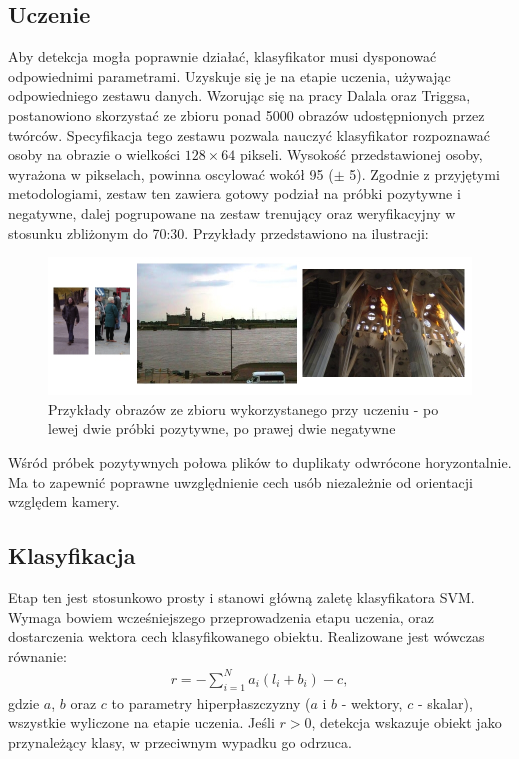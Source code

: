 \subsection{Uczenie}
Aby detekcja mogła poprawnie działać, klasyfikator musi dysponować odpowiednimi parametrami. Uzyskuje się je na etapie uczenia, używając odpowiedniego zestawu danych.
Wzorując się na pracy Dalala oraz Triggsa, postanowiono skorzystać ze zbioru ponad 5000 obrazów udostępnionych przez twórców. Specyfikacja tego zestawu pozwala nauczyć klasyfikator rozpoznawać osoby na obrazie o wielkości $128\times 64$ pikseli. Wysokość przedstawionej osoby, wyrażona w pikselach, powinna oscylować wokół 95 ($\pm$ 5). \newline
Zgodnie z przyjętymi metodologiami, zestaw ten zawiera gotowy podział na próbki pozytywne i negatywne, dalej pogrupowane na zestaw trenujący oraz weryfikacyjny w stosunku zbliżonym do 70:30. Przykłady przedstawiono na ilustracji:

\begin{figure}[h]
	\centering
	\captionsetup{justification=centering,margin=1cm}
	\hspace*{1cm}
	\includegraphics[width=14.5cm]{3_HOG_image_examples.jpg}
	\caption{Przykłady obrazów ze zbioru wykorzystanego przy uczeniu - po lewej dwie próbki pozytywne, po prawej dwie negatywne}
	\label{fig:HOG_image_examples}
\end{figure}
Wśród próbek pozytywnych połowa plików to duplikaty odwrócone horyzontalnie. Ma to zapewnić poprawne uwzględnienie cech usób niezależnie od orientacji względem kamery.

\subsection{Klasyfikacja}
\label{sec:klasyfikacja}
Etap ten jest stosunkowo prosty i stanowi główną zaletę klasyfikatora SVM. Wymaga bowiem wcześniejszego przeprowadzenia etapu uczenia, oraz dostarczenia wektora cech klasyfikowanego obiektu. Realizowane jest wówczas równanie:
\begin{equation}
\label{eq:HOG_classification}
\left.\begin{aligned} 
r=-\sum_{i=1}^{N}a_i(l_i+b_i)-c,
\end{aligned}\right.
\end{equation}
gdzie $a$, $b$ oraz $c$ to parametry hiperpłaszczyzny ($a$ i $b$ - wektory, $c$ - skalar), wszystkie wyliczone na etapie uczenia.
Jeśli $r>0$, detekcja wskazuje obiekt jako przynależący klasy, w przeciwnym wypadku go odrzuca.

